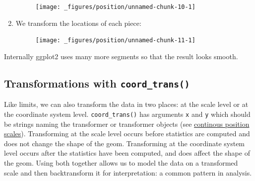 \begin{enumerate}
  \begin{figure}[H]
    \centering
    \texttt{[image: \_figures/position/unnamed-chunk-10-1]}
  \end{figure}
\item
  We transform the locations of each piece:

\begin{Shaded}
\begin{Highlighting}[]
\StringTok{ }
  \OperatorTok{*}\StringTok{ }
  \OperatorTok{*}\StringTok{ }
\NormalTok{)}

\OperatorTok{+}\StringTok{ }
\StringTok{  }\NormalTok{() }\OperatorTok{+}\StringTok{ }
\StringTok{  }\NormalTok{(} \NormalTok{, } \NormalTok{) }\OperatorTok{+}\StringTok{ }
\StringTok{  }\NormalTok{()}
\end{Highlighting}
\end{Shaded}

  \begin{figure}[H]
    \centering
    \texttt{[image: \_figures/position/unnamed-chunk-11-1]}
  \end{figure}
\end{enumerate}

Internally ggplot2 uses many more segments so that the result looks
smooth.

\hypertarget{transformations-with-coord_trans}{%
\subsection{\texorpdfstring{Transformations with
\texttt{coord\_trans()}}{Transformations with coord\_trans()}}\label{transformations-with-coord_trans}}

Like limits, we can also transform the data in two places: at the scale
level or at the coordinate system level. \texttt{coord\_trans()} has
arguments \texttt{x} and \texttt{y} which should be strings naming the
transformer or transformer objects (see
\protect\hyperlink{sub:scale-position}{continous position scales}).
Transforming at the scale level occurs before statistics are computed
and does not change the shape of the geom. Transforming at the
coordinate system level occurs after the statistics have been computed,
and does affect the shape of the geom. Using both together allows us to
model the data on a transformed scale and then backtransform it for
interpretation: a common pattern in analysis.
 

